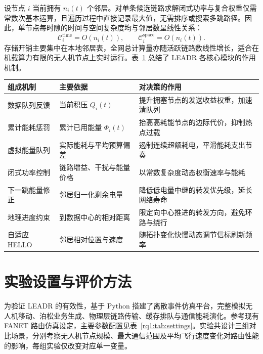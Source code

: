 设节点 $i$ 当前拥有 $n_i(t)$ 个邻居。对单条候选链路求解闭式功率与复合权重仅需常数次基本运算，且遍历过程中直接记录最大值，无需排序或搜索多跳路径。因此，单节点每时隙的时间与空间复杂度均与邻居数呈线性关系：
\begin{equation}
 \mathcal{C}_{i}^{\mathrm{time}}=O(n_i(t)),\qquad
 \mathcal{C}_{i}^{\mathrm{space}}=O(n_i(t)).
 \label{rq1:eq:complexity}
\end{equation}
存储开销主要集中在本地邻居表，全网总计算量亦随活跃链路数线性增长，适合在机载算力有限的无人机节点上实时运行。表~\ref{rq1:tab:components} 总结了 LEADR 各核心模块的作用机制。

\begin{table}[!htbp]
\centering\small
{}
\label{rq1:tab:components}
\begin{tabularx}{\textwidth}{p{}p{}X}
\toprule
组成机制 & 主要依据 & 对决策的作用 \\
\midrule
数据队列反馈 & 当前积压 $Q_i(t)$ & 提升拥塞节点的发送收益权重，加速清队列 \\
累计能耗惩罚 & 累计已用能量 $\Phi_i(t)$ & 抬高高耗能节点的边际代价，抑制热点过载 \\
虚拟能量队列 & 实际能耗与平均预算偏差 & 遏制连续超额耗电，平滑能耗支出节奏 \\
闭式功率控制 & 链路增益、干扰与能量价格 & 以常数复杂度动态权衡速率与能耗 \\
下一跳能量修正 & 邻居归一化剩余电量 & 降低低电量中继的转发优先级，延长网络寿命 \\
地理进度约束 & 到数据中心的相对距离 & 限定向中心推进的转发方向，避免环路与绕行 \\
自适应 HELLO & 邻居相对位置与速度 & 随拓扑变化快慢动态调节信标刷新频率 \\
\bottomrule
\end{tabularx}
\end{table}

\section{实验设置与评价方法}
\label{rq1:sec:experiments}

为验证 LEADR 的有效性，基于 Python 搭建了离散事件仿真平台，完整模拟无人机移动、泊松业务生成、物理层链路传输、缓存排队与通信能耗演化。参考现有 FANET 路由仿真设定\cite{qtar,drlfr}，主要参数配置见表~\ref{rq1:tab:settings}。实验共设计三组对比场景，分别考察无人机节点规模、最大通信范围及平均飞行速度变化对路由性能的影响，每组实验仅改变对应单一变量。

